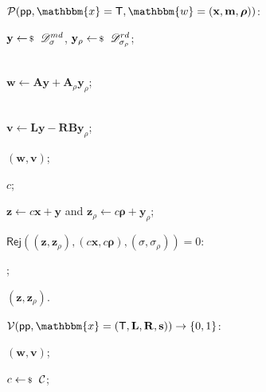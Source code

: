 \documentclass[../../book.tex]{subfiles}
\begin{document}
\begin{algoproto}[H]
    \footnotesize
    \centering
    \begin{mdframed}[linecolor=black, linewidth=1pt,
                     skipabove=10pt, skipbelow=10pt,
                     innerleftmargin=5pt, innerrightmargin=5pt]
        \begin{minipage}[t]{0.49\linewidth}
            \colorbox{oc-blue-1}{$\mathcal{P}(\mathsf{pp}, \mathbbm{x} = \mathsf{T}, \mathbbm{w}=(\mathbf{x}, \mathbf{m}, \boldsymbol{\rho}))$:}
            \begin{algoen}
                \item $\mathbf{y} \leftarrowS \dgaussian_{\sigma}^{md}$, $\mathbf{y}_{\rho} \leftarrowS \dgaussian_{\sigma_{\rho}}^{rd}$;
                \item {} \\ $\mathbf{w} \gets \mathbf{A}\mathbf{y} + \mathbf{A}_{\rho}\mathbf{y}_{\rho}$;
                \item {} \\ $\mathbf{v} \gets \mathbf{L}\mathbf{y} - \mathbf{R}\mathbf{B}\mathbf{y}_{\rho}$;
                \item {} $(\mathbf{w}, \mathbf{v})$;
                \item {} $c$;
                \item $\mathbf{z} \gets c\mathbf{x} + \mathbf{y}$ and $\mathbf{z}_{\rho} \gets c\boldsymbol{\rho} + \mathbf{y}_{\rho}$;
                \item {} $\mathsf{Rej}((\mathbf{z},\mathbf{z}_{\rho}), (c\mathbf{x},c\boldsymbol{\rho}), (\sigma,\sigma_{\rho})) = 0$: 
                \item \hspace{5px} ;
                \item {} $(\mathbf{z}, \mathbf{z}_{\rho})$.
            \end{algoen}
        \end{minipage}
        \hfill
        \begin{minipage}[t]{0.5\linewidth}
            \colorbox{oc-blue-1}{$\mathcal{V}(\mathsf{pp}, \mathbbm{x}=(\mathsf{T}, \mathbf{L}, \mathbf{R}, \mathbf{s})) \to \{0,1\}$:}
            \begin{algoen}
                \item {} $(\mathbf{w}, \mathbf{v})$;
                \item {} $c \leftarrowS \mathcal{C}$;

\end{algoen}
\end{minipage}
\end{mdframed}
\end{algoproto}
\end{document}
